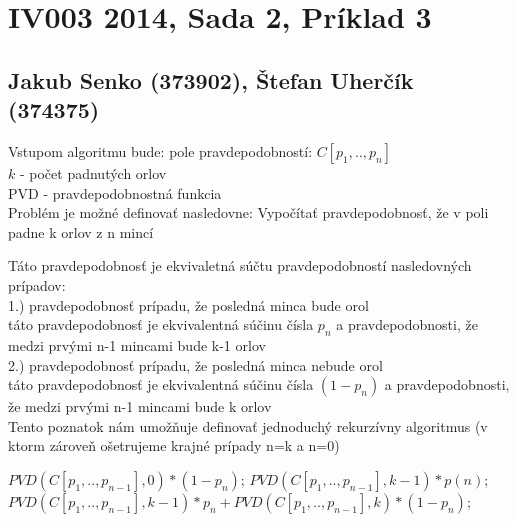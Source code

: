 \documentclass[paper=a4, fontsize=11pt]{scrartcl} %
\numberwithin{equation}{section} %
\numberwithin{figure}{section} %
\numberwithin{table}{section} %
\begin{document}
\pagebreak


\section*{IV003 2014, Sada 2, Príklad 3}
\subsection*{Jakub Senko (373902), Štefan Uherčík (374375)}

Vstupom algoritmu bude:
pole pravdepodobností: $C[{p}_1,..,{p}_n]$\\
$k$ - počet padnutých orlov\\
PVD - pravdepodobnostná funkcia\ \\

Problém je možné definovať nasledovne: 
Vypočítať pravdepodobnosť, že v poli padne k orlov z n mincí

Táto pravdepodobnosť je ekvivaletná súčtu pravdepodobností nasledovných prípadov: \ \\

1.) pravdepodobnosť prípadu, že posledná minca bude orol \ \\
táto pravdepodobnosť je ekvivalentná súčinu čísla ${p}_n$ a pravdepodobnosti, že medzi prvými n-1 mincami bude k-1 orlov \ \\

2.) pravdepodobnosť prípadu, že posledná minca nebude orol \ \\
táto pravdepodobnosť je ekvivalentná súčinu čísla $(1-{p}_n)$ a pravdepodobnosti, že medzi prvými n-1 mincami bude k orlov \ \\

Tento poznatok nám umožňuje definovať jednoduchý rekurzívny algoritmus (v ktorm zároveň ošetrujeme krajné prípady n=k a n=0) \ \\

\begin{algorithmic}[1]
            \State \Return $PVD(C[{p}_1,..,{p}_{n-1}],0)*(1-{p}_n)$;
        \EndIf
            \State \Return $PVD(C[{p}_1,..,{p}_{n-1}],k-1)*p(n)$;
        \EndIf
        \State \Return $PVD(C[{p}_1,..,{p}_{n-1}],k-1)*{p}_{n} + PVD(C[{p}_1,..,{p}_{n-1}],k)*(1-{p}_{n})$;
    \EndFunction
\end{algorithmic}
\ \\
\end{document}
